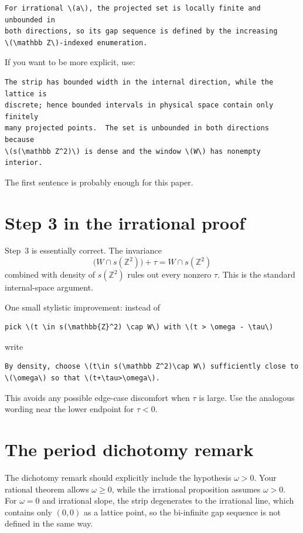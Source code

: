 \documentclass[11pt]{article}
\begin{document}
\begin{lstlisting}
For irrational \(a\), the projected set is locally finite and unbounded in
both directions, so its gap sequence is defined by the increasing
\(\mathbb Z\)-indexed enumeration.
\end{lstlisting}

If you want to be more explicit, use:

\begin{lstlisting}
The strip has bounded width in the internal direction, while the lattice is
discrete; hence bounded intervals in physical space contain only finitely
many projected points.  The set is unbounded in both directions because
\(s(\mathbb Z^2)\) is dense and the window \(W\) has nonempty interior.
\end{lstlisting}

The first sentence is probably enough for this paper.

\section{Step 3 in the irrational proof}

Step~3 is essentially correct.  The invariance
\[
    \bigl(W\cap s(\mathbb Z^2)\bigr)+\tau
    =
    W\cap s(\mathbb Z^2)
\]
combined with density of \(s(\mathbb Z^2)\) rules out every nonzero
\(\tau\).  This is the standard internal-space argument.

One small stylistic improvement: instead of

\begin{lstlisting}
pick \(t \in s(\mathbb{Z}^2) \cap W\) with \(t > \omega - \tau\)
\end{lstlisting}

write

\begin{lstlisting}
By density, choose \(t\in s(\mathbb Z^2)\cap W\) sufficiently close to
\(\omega\) so that \(t+\tau>\omega\).
\end{lstlisting}

This avoids any possible edge-case discomfort when \(\tau\) is large.  Use the
analogous wording near the lower endpoint for \(\tau<0\).

\section{The period dichotomy remark}

The dichotomy remark should explicitly include the hypothesis \(\omega>0\).
Your rational theorem allows \(\omega\ge0\), while the irrational proposition
assumes \(\omega>0\).  For \(\omega=0\) and irrational slope, the strip
degenerates to the irrational line, which contains only \((0,0)\) as a lattice
point, so the bi-infinite gap sequence is not defined in the same way.
\end{document}
